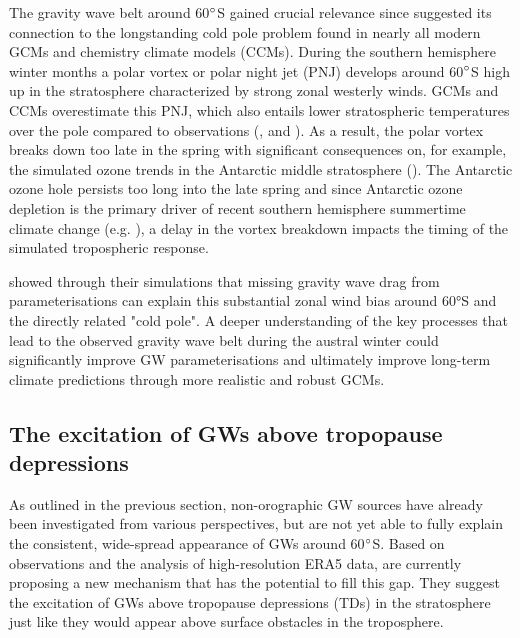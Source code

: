 The gravity wave belt around 60$\degree$S gained crucial relevance since \textcite{mclandress_is_2012} suggested its connection to the longstanding cold pole problem found in nearly all modern GCMs and chemistry climate models (CCMs). During the southern hemisphere winter months a polar vortex or polar night jet (PNJ) develops around 60$\degree$S high up in the stratosphere characterized by strong zonal westerly winds. GCMs and CCMs overestimate this PNJ, which also entails lower stratospheric temperatures over the pole compared to observations (\cite{butchart_multimodel_2011}, \cite{geller_comparison_2013} and \cite{eyring_sparc_2010}). As a result, the polar vortex breaks down too late in the spring with significant consequences on, for example, the simulated ozone trends in the Antarctic middle stratosphere (\cite{stolarski_ozone_2006}). The Antarctic ozone hole persists too long into the late spring and since Antarctic ozone depletion is the primary driver of recent southern hemisphere summertime climate change (e.g. \cite{arblaster_contributions_2006}), a delay in the vortex breakdown impacts the timing of the simulated tropospheric response.

\textcite{mclandress_is_2012} showed through their simulations that missing gravity wave drag from parameterisations can explain this substantial zonal wind bias around 60°S and the directly related "cold pole". A deeper understanding of the key processes that lead to the observed gravity wave belt during the austral winter could significantly improve GW parameterisations and ultimately improve long-term climate predictions through more realistic and robust GCMs. 





\subsection{The excitation of GWs above tropopause depressions}
\label{sec:excitation}

As outlined in the previous section, non-orographic GW sources have already been investigated from various perspectives, but are not yet able to fully explain the consistent, wide-spread appearance of GWs around 60$\degree$S. Based on observations and the analysis of high-resolution ERA5 data, \textcite{dornbrack_stratospheric_2021} are currently proposing a new mechanism that has the potential to fill this gap. They suggest the excitation of GWs above tropopause depressions (TDs) in the stratosphere just like they would appear above surface obstacles in the troposphere. 

